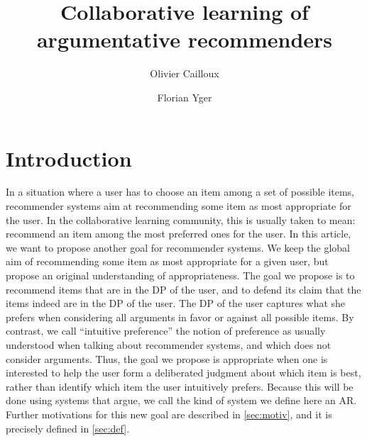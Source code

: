 \documentclass[version=3.21, pagesize, twoside=off, bibliography=totoc, DIV=calc, fontsize=12pt, a4paper, french, english]{scrartcl}
\begin{document}
\title{%
	Collaborative learning of argumentative recommenders%
}
\author{Olivier Cailloux}
\author{Florian Yger}
\makeatletter
\makeatother
\maketitle

\acresetall

\section{Introduction}
\label{sec:intro}
In a situation where a user has to choose an item among a set of possible items, recommender systems aim at recommending some item as most appropriate for the user.
In the collaborative learning community, this is usually taken to mean: recommend an item among the most preferred ones for the user. 
In this article, we want to propose another goal for recommender systems. We keep the global aim of recommending some item as most appropriate for a given user, but propose an original understanding of appropriateness. The goal we propose is to recommend items that are in the \ac{DP} of the user, and to defend its claim that the items indeed are in the \ac{DP} of the user. The \ac{DP} of the user captures what she prefers when considering all arguments in favor or against all possible items. By contrast, we call “intuitive preference” the notion of preference as usually understood when talking about recommender systems, and which does not consider arguments. Thus, the goal we propose is appropriate when one is interested to help the user form a deliberated judgment about which item is best, rather than identify which item the user intuitively prefers. Because this will be done using systems that argue, we call the kind of system we define here an \ac{AR}.
Further motivations for this new goal are described in \cref{sec:motiv}, and it is precisely defined in \cref{sec:def}.
\end{document}
